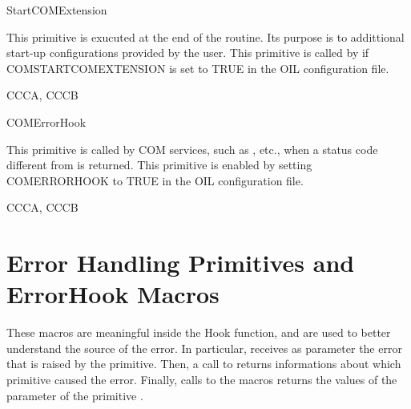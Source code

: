 \begin{function_nopb}{StartCOMExtension}
  \begin{fundescription}
    This primitive is exucuted at the end of the  routine. Its 
    purpose is to addittional start-up configurations provided by the user. This 
    primitive is called by  if COMSTARTCOMEXTENSION  is set to 
    TRUE in the OIL configuration file. 
  \end{fundescription}
  \begin{funreturn}
   \end{funreturn}
  \begin{funconformance}
    CCCA, CCCB
  \end{funconformance}
\end{function_nopb}

\begin{function_nopb}{COMErrorHook}
  \begin{fundescription}
    This primitive is called by COM services, such as , 
     etc., when a status code different from  is 
     returned. This primitive is enabled by setting COMERRORHOOK to TRUE in 
     the OIL configuration file. 
  \end{fundescription}
  \begin{funparameters}
  \end{funparameters}
  \begin{funconformance}
    CCCA, CCCB
  \end{funconformance}
\end{function_nopb}


\pagebreak


\section{Error Handling Primitives and ErrorHook Macros}
\label{sec:errorhook-macros}
These macros are meaningful inside the  Hook
function, and are used to better understand the source of the
error. In particular,  receives as parameter the
error that is raised by the primitive. Then, a call to
 returns informations about which
primitive caused the error. Finally, calls to the macros
 returns the values of the  parameter
of the primitive . 

